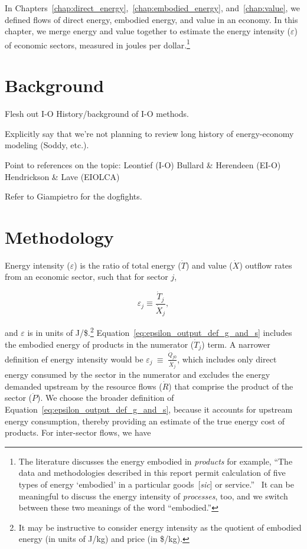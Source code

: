 In Chapters~\ref{chap:direct_energy},~\ref{chap:embodied_energy}, and~\ref{chap:value}, 
we defined flows of direct energy, embodied energy, and value in an economy.
In this chapter, we merge energy and value together to estimate
the energy intensity ($\varepsilon$) of economic sectors,
measured in joules per dollar.\footnote{The literature discusses 
the energy embodied in \emph{products} for example, ``The data and methodologies described in this report 
permit calculation of five types of energy `embodied' 
in a particular goods~[\emph{sic}] or service.''~\cite[p.~268]{Bullard:1978vd} %
It can be meaningful to discuss the energy intensity of \emph{processes}, too,
and we switch between these two meanings of the word ``embodied.''}

\section{Background}

Flesh out I-O History/background of I-O methods. 

Explicitly say that we’re not planning to review long history 
of energy-economy modeling (Soddy, etc.). 

Point to references on the topic:
Leontief (I-O)
Bullard & Herendeen (EI-O)
Hendrickson & Lave (EIOLCA)

Refer to Giampietro for the dogfights.


\section{Methodology}

Energy intensity ($\varepsilon$)
is the ratio 
of total energy ($\dot{T}$) 
and value ($\dot{X}$) outflow rates 
from an economic sector, 
such that for sector $j$, %

\begin{equation} \label{eq:epsilon_output_def_g_and_s}
	\varepsilon_{j} \equiv \frac{\dot{T}_{j}}{\dot{X}_{j}},
\end{equation} 

\noindent{}and $\varepsilon$ is in units of J/\$.\footnote{It may be
instructive to consider energy intensity as the quotient
of embodied energy (in units of J/kg) and price (in \$/kg).}
Equation~\ref{eq:epsilon_output_def_g_and_s}
includes the embodied energy of products in the numerator ($\dot{T}_{j}$) term. 
A narrower definition ef energy intensity would be 
$\varepsilon_{j}~\equiv~\frac{\dot{Q}_{j0}}{\dot{X}_{j}}$,
which includes only direct energy consumed by the sector
in the numerator
and excludes the energy demanded upstream by the 
resource flows ($\dot{R}$) that comprise the product of the sector ($\dot{P}$).
We choose the broader definition of
Equation~\ref{eq:epsilon_output_def_g_and_s},
because it accounts for upstream energy consumption,
thereby providing an estimate of the true energy cost of products.
For inter-sector flows, we have

